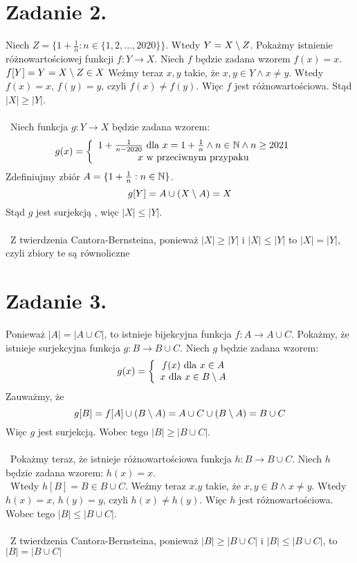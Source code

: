 \documentclass{article}
\begin{document}
\section*{Zadanie 2.}
Niech $Z = \{1+ \frac{1}{n} : n \in \{1,2, ... ,2020\}\}$. Wtedy $Y = X\setminus Z$.
Pokażmy istnienie różnowartościowej funkcji $f: Y \rightarrow X$. Niech $f$ będzie zadana wzorem $f(x) = x$. $f[Y] = Y = X \setminus Z \in X$ Weźmy teraz $x,y$ takie, że $x,y \in Y \wedge x\neq y$.
Wtedy $f(x) = x$, $f(y) = y$, czyli $f(x) \neq f(y)$. Więc $f$ jest różnowartościowa. Stąd $|X|\geq|Y|$.
\\\
\\\
Niech funkcja $g:Y\rightarrow X$ będzie zadana wzorem:
\[g(x) = \left\{\begin{array}{cc}
   1 + \frac{1}{n-2020}  \ \mbox{dla} \ x = 1 + \frac{1}{n} \wedge n\in \mathbb{N} \wedge n\geq 2021 &  \\
    x  \ \mbox{w przeciwnym przypaku} & 
\end{array}\right.\]
Zdefiniujmy zbiór $A = \{1 + \frac{1}{n} : n\in \mathbb{N}\}$.
\[g[Y] = A \cup (X \setminus A) = X\]
Stąd $g$ jest surjekcją , więc $|X|\leq|Y|$.
\\\
\\\
Z twierdzenia Cantora-Bernsteina, ponieważ $|X|\geq|Y|$ i $|X|\leq|Y|$ to $|X|=|Y|$, czyli zbiory te są równoliczne


\section*{Zadanie 3.}
Ponieważ $|A| = |A \cup C|$, to istnieje bijekcyjna funkcja $f: A \rightarrow A \cup C$. Pokażmy, że istnieje surjekcyjna funkcja $g: B \rightarrow B\cup C$. Niech $g$ będzie zadana wzorem:
\[g(x) = \left\{\begin{array}{cc}
   f(x) \ \mbox{dla} \ x \in A &  \\
    x  \ \mbox{dla} \ x\in B\setminus A& 
\end{array}\right.\]
Zauważmy, że 
\[g[B] = f[A] \cup (B\setminus A) = A \cup C \cup (B\setminus A) = B \cup C\]
Więc $g$ jest surjekcją.
Wobec tego $|B|\geq|B \cup C|$.
\\\
\\\
Pokażmy teraz, że istnieje różnowartościowa funkcja $h: B \rightarrow B\cup C$. Niech $h$ będzie zadana wzorem:
$h(x) = x$.
\\\
Wtedy $h[B] = B \in B\cup C$. Weźmy teraz $x.y$ takie, że $x,y \in B \wedge x\neq y$.
Wtedy $h(x) = x$, $h(y) = y$, czyli $h(x) \neq h(y)$. Więc $h$ jest różnowartościowa.
Wobec tego $|B|\leq|B\cup C|$.
\\\
\\\
Z twierdzenia Cantora-Bernsteina, ponieważ $|B|\geq|B \cup C|$ i $|B|\leq|B
\cup C|$, to $|B|=|B \cup C|$
\end{document}
